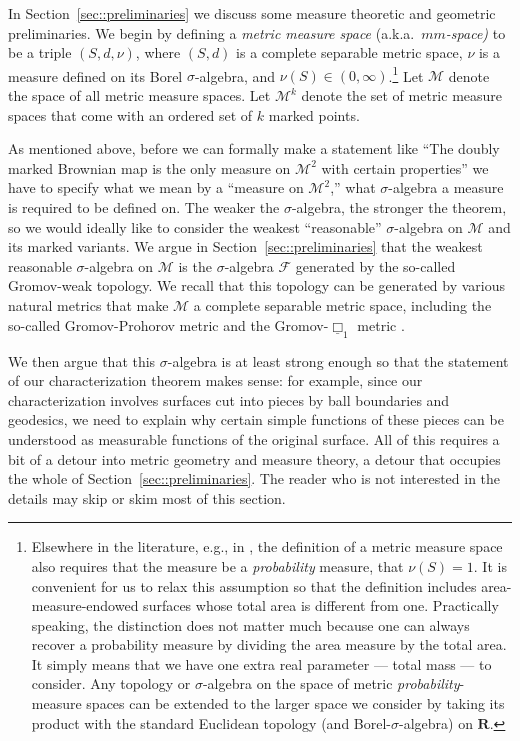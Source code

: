 \documentclass[10pt]{amsart}
\let\mathcal\mathscr
\theoremstyle{plain}
\numberwithin{theorem}{section}
\theoremstyle{definition}
\newcommand\mmspace{{\mathcal M}}
\newcommand\mmsigma{{\mathcal F}}
\newcommand{\R}{\mathbf{R}}
\begin{document}
In Section~\ref{sec::preliminaries} we discuss some measure theoretic and geometric preliminaries. We begin by defining a \emph{metric measure space} (a.k.a.\ \emph{$mm$-space)} to be a triple $(S, d, \nu)$, where $(S,d)$ is a complete separable metric space, $\nu$ is a measure defined on its Borel $\sigma$-algebra, and $\nu(S) \in (0, \infty)$.\footnote{Elsewhere in the literature, e.g., in \cite{grevenpfaffelhuberwinter}, the definition of a metric measure space also requires that the measure be a \emph{probability} measure, \ie that $\nu(S) = 1$. It is convenient for us to relax this assumption so that the definition includes area-measure-endowed surfaces whose total area is different from one. Practically speaking, the distinction does not matter much because one can always recover a probability measure by dividing the area measure by the total area. It simply means that we have one extra real parameter --- total mass --- to consider. Any topology or $\sigma$-algebra on the space of metric \emph{probability}-measure spaces can be extended to the larger space we consider by taking its product with the standard Euclidean topology (and Borel-$\sigma$-algebra) on $\R$.} Let $\mmspace$ denote the space of all metric measure spaces. Let $\mmspace^k$ denote the set of metric measure spaces that come with an ordered set of $k$ marked points.

As mentioned above, before we can formally make a statement like ``The doubly marked Brownian map is the only measure on $\mmspace^2$ with certain properties'' we have to specify what we mean by a ``measure on $\mmspace^2$,'' \ie what $\sigma$-algebra a measure is required to be defined on. The weaker the $\sigma$-algebra, the stronger the theorem, so we would ideally like to consider the weakest ``reasonable'' $\sigma$-algebra on $\mmspace$ and its marked variants. We argue in Section~\ref{sec::preliminaries} that the weakest reasonable $\sigma$-algebra on $\mmspace$ is the $\sigma$-algebra $\mmsigma$ generated by the so-called Gromov-weak topology. We recall that this topology can be generated by various natural metrics that make $\mmspace$ a complete separable metric space, including the so-called Gromov-Prohorov metric and the Gromov-$\underline \Box_1$ metric \cite{grevenpfaffelhuberwinter, gromovprohorovandgromovbox}.

We then argue that this $\sigma$-algebra is at least strong enough so that the statement of our characterization theorem makes sense: for example, since our characterization involves surfaces cut into pieces by ball boundaries and geodesics, we need to explain why certain simple functions of these pieces can be understood as measurable functions of the original surface. All of this requires a bit of a detour into metric geometry and measure theory, a detour that occupies the whole of Section~\ref{sec::preliminaries}. The reader who is not interested in the details may skip or skim most of this section.\enlargethispage{.1\baselineskip}%
\end{document}
